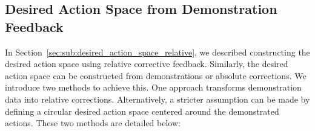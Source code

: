 

\subsection{Desired Action Space from Demonstration Feedback}
\label{sec:sub:desired_action_space_absolute}

In Section~\ref{sec:sub:desired_action_space_relative}, we described constructing the desired action space using relative corrective feedback. Similarly, the desired action space can be constructed from demonstrations or absolute corrections. We introduce two methods to achieve this. One approach transforms demonstration data into relative corrections. Alternatively, 
a stricter assumption can be made by defining a circular desired action space centered around the demonstrated actions. These two methods are detailed below:



